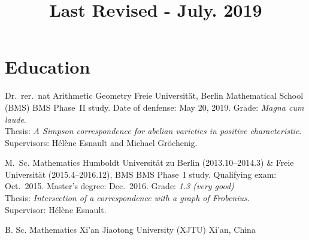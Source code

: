 \documentclass[10pt,a4paper,roman]{moderncv}
\title{\normalsize Last Revised - July. 2019}
\begin{document}
\maketitle





\section{Education}
%
{Dr.\ rer.\ nat}%
{Arithmetic Geometry}%
{Freie Universität, Berlin Mathematical School (BMS)}%
{}%
{
    BMS Phase~II study. Date of denfense: May 20, 2019. Grade: \emph{Magna cum
    laude}.\\
    Thesis: \emph{A Simpson correspondence for abelian varieties in positive
    characteristic}.\\
    Supervisors: Hélène Esnault and Michael Gröchenig.
}

{M.\ Sc.}%
{Mathematics}%
{%
    Humboldt Universität zu Berlin (2013.10--2014.3) \&
    Freie Universität (2015.4--2016.12), BMS
}%
{}%
{%
    BMS Phase~I study. Qualifying exam: Oct.\ 2015.
    Master's degree: Dec.\ 2016. Grade: \emph{1.3 (very good)}\\
    Thesis: \emph{Intersection of a correspondence with a graph of Frobenius}.\\
    Supervisor: Hélène Esnault.
}

%
{B. Sc.}%
{Mathematics}%
{Xi'an Jiaotong University (XJTU)}%
{Xi'an, China}{}%
\end{document}
